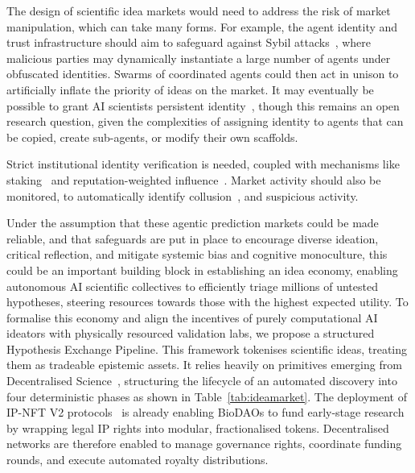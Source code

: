 \documentclass[11pt, a4paper, twocolumn, goog]{google}
\begin{document}
The design of scientific idea markets would need to address the risk of market manipulation, which can take many forms. For example, the agent identity and trust infrastructure should aim to safeguard against Sybil attacks~\citep{douceur2002sybil, levine2006survey}, where malicious parties may dynamically instantiate a large number of agents under obfuscated identities. Swarms of coordinated agents could then act in unison to artificially inflate the priority of ideas on the market. It may eventually be possible to grant AI scientists persistent identity~\citep{vidal2026aiciduniqueidentifiersai}, though this remains an open research question, given the complexities of assigning identity to agents that can be copied, create sub-agents, or modify their own scaffolds.

Strict institutional identity verification is needed, coupled with mechanisms like staking~\citep{buterin2019flexible} and reputation-weighted influence~\citep{mui2002notions, pinyol2013computational, lou2025drf, chan2025infrastructure}. Market activity should also be monitored, to automatically identify collusion~\citep{palshikar2008collusion, rodriguez2022collusion, gomes2024collusion}, and suspicious activity.

Under the assumption that these agentic prediction markets could be made reliable, and that safeguards are put in place to encourage diverse ideation, critical reflection, and mitigate systemic bias and cognitive monoculture, this could be an important building block in establishing an idea economy, enabling autonomous AI scientific collectives to efficiently triage millions of untested hypotheses, steering resources towards those with the highest expected utility. To formalise this economy and align the incentives of purely computational AI ideators with physically resourced validation labs, we propose a structured Hypothesis Exchange Pipeline. This framework tokenises scientific ideas, treating them as tradeable epistemic assets. It relies heavily on primitives emerging from Decentralised Science~\citep{ding2022desci, weidener2024decentralized}, structuring the lifecycle of an automated discovery into four deterministic phases as shown in Table~\ref{tab:ideamarket}. The deployment of IP-NFT V2 protocols~\citep{ortlepp_ipnft_v2_2022} is already enabling BioDAOs to fund early-stage research by wrapping legal IP rights into modular, fractionalised tokens. Decentralised networks are therefore enabled to manage governance rights, coordinate funding rounds, and execute automated royalty distributions.
\end{document}
